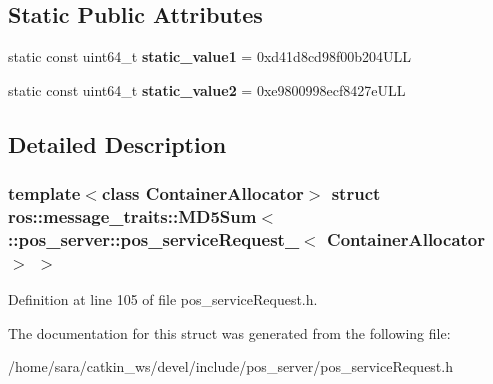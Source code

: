 \subsection*{Static Public Attributes}
\begin{DoxyCompactItemize}
\item 
\mbox{\label{structros_1_1message__traits_1_1MD5Sum_3_01_1_1pos__server_1_1pos__serviceRequest___3_01ContainerAllocator_01_4_01_4_abc916d613abd52fe2b7f5f3725921db2}} 
static const uint64\+\_\+t {\bfseries static\+\_\+value1} = 0xd41d8cd98f00b204\+U\+LL
\item 
\mbox{\label{structros_1_1message__traits_1_1MD5Sum_3_01_1_1pos__server_1_1pos__serviceRequest___3_01ContainerAllocator_01_4_01_4_a41a8bc0b688b342f5a6cafa2c2143ce3}} 
static const uint64\+\_\+t {\bfseries static\+\_\+value2} = 0xe9800998ecf8427e\+U\+LL
\end{DoxyCompactItemize}


\subsection{Detailed Description}
\subsubsection*{template$<$class Container\+Allocator$>$\newline
struct ros\+::message\+\_\+traits\+::\+M\+D5\+Sum$<$ \+::pos\+\_\+server\+::pos\+\_\+service\+Request\+\_\+$<$ Container\+Allocator $>$ $>$}



Definition at line 105 of file pos\+\_\+service\+Request.\+h.



The documentation for this struct was generated from the following file\+:\begin{DoxyCompactItemize}
\item 
/home/sara/catkin\+\_\+ws/devel/include/pos\+\_\+server/pos\+\_\+service\+Request.\+h\end{DoxyCompactItemize}
